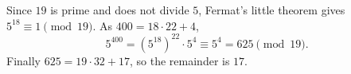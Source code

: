 Since $19$ is prime and does not divide $5$, Fermat's little theorem gives $5^{18}\equiv1\pmod{19}$. As $400=18\cdot22+4$,
\[
5^{400}=\left(5^{18}\right)^{22}\cdot5^4\equiv5^4=625\pmod{19}.
\]
Finally $625=19\cdot32+17$, so the remainder is $\boxed{17}$.

